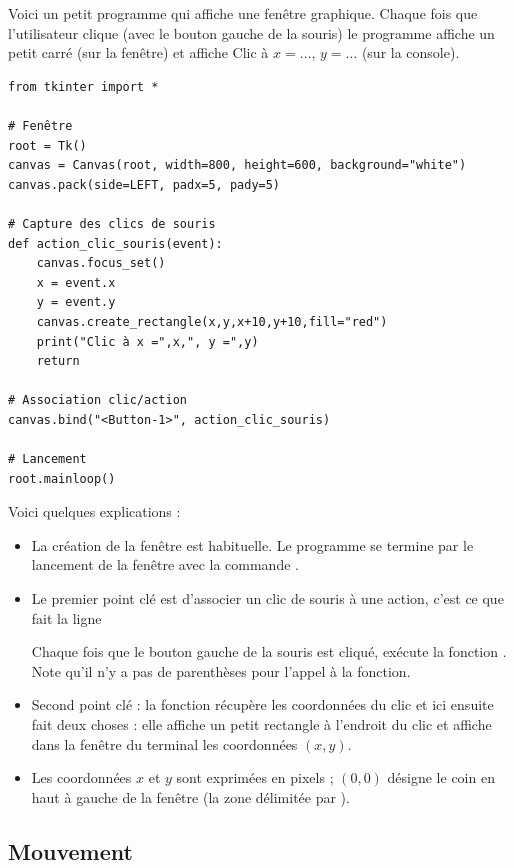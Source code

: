 \documentclass[11pt,class=report,crop=false]{standalone}
\begin{document}
Voici un petit programme qui affiche une fenêtre graphique. Chaque fois que l'utilisateur clique (avec le bouton gauche de la souris) le programme affiche un petit carré (sur la fenêtre) et affiche \og{}Clic à $x=\ldots$, $y=\ldots$\fg{} (sur la console). 

\begin{lstlisting}
from tkinter import *

# Fenêtre
root = Tk()
canvas = Canvas(root, width=800, height=600, background="white")
canvas.pack(side=LEFT, padx=5, pady=5)

# Capture des clics de souris
def action_clic_souris(event):
    canvas.focus_set()
    x = event.x
    y = event.y
    canvas.create_rectangle(x,y,x+10,y+10,fill="red")
    print("Clic à x =",x,", y =",y)
    return

# Association clic/action
canvas.bind("<Button-1>", action_clic_souris)

# Lancement
root.mainloop()
\end{lstlisting}


Voici quelques explications :
\begin{itemize}
  \item La création de la fenêtre est habituelle. Le programme se termine par le lancement de la fenêtre avec la commande .
  
  \item Le premier point clé est d'associer un clic de souris à une action, c'est ce que fait la ligne 

Chaque fois que le bouton gauche de la souris est cliqué, \Python{} exécute la fonction . Note qu'il n'y a pas de parenthèses pour l'appel à la fonction.

   \item Second point clé : la fonction  récupère les coordonnées du clic et ici ensuite fait deux choses : elle affiche un petit rectangle à l'endroit du clic et affiche dans la fenêtre du terminal les coordonnées $(x,y)$.
   
   \item Les coordonnées $x$ et $y$ sont exprimées en pixels ; $(0,0)$ désigne le coin en haut à gauche de la fenêtre (la zone délimitée par ).
\end{itemize}

\subsection{Mouvement}
\end{document}
